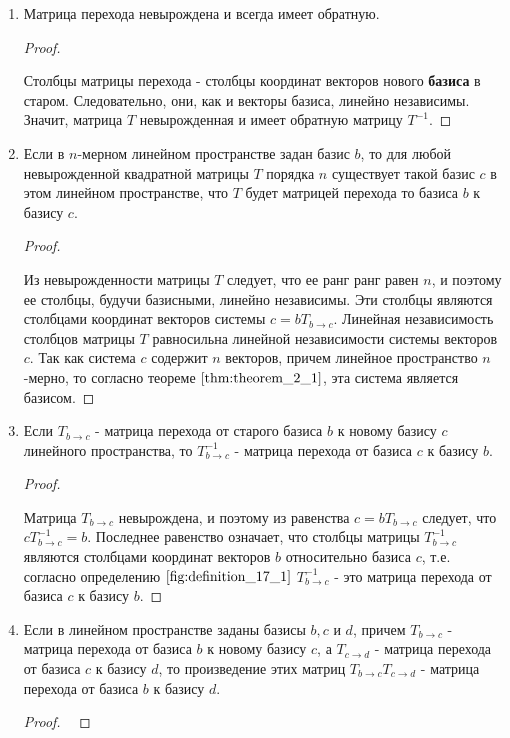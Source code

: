 \begin{enumerate}[label={\arabic*°.}]
    \item Матрица перехода невырождена и всегда имеет обратную.
    \begin{proof}~

        Столбцы матрицы перехода - столбцы координат векторов нового \textbf{базиса} в старом. Следовательно, они, как и векторы базиса, линейно независимы. Значит, матрица $T$ невырожденная и имеет обратную матрицу $T^{-1}$.
    \end{proof}
    
    \item Если в $n$-мерном линейном пространстве задан базис $b$, то для любой невырожденной квадратной матрицы $T$ порядка $n$ существует такой базис $c$ в этом линейном пространстве, что $T$ будет матрицей перехода то базиса $b$ к базису $c$.
    \begin{proof}~

        Из невырожденности матрицы $T$ следует, что ее ранг ранг равен $n$, и поэтому ее столбцы, будучи базисными, линейно независимы. Эти столбцы являются столбцами координат векторов системы $c = bT_{b \to c}$. Линейная независимость столбцов матрицы $T$ равносильна линейной независимости системы векторов $c$. Так как система $c$ содержит $n$ векторов, причем линейное пространство $n$-мерно, то согласно теореме $\eqref{thm:theorem_2_1}$, эта система является базисом.
    \end{proof}
    
    \item Если $T_{b \to c}$ - матрица перехода от старого базиса $b$ к новому базису $c$ линейного пространства, то $T^{-1}_{b \to c}$ - матрица перехода от базиса $c$ к базису $b$.
    \begin{proof}~

        Матрица $T_{b \to c}$ невырождена, и поэтому из равенства $c = bT_{b \to c}$ следует, что $cT^{-1}_{b \to c} = b$. Последнее равенство означает, что столбцы матрицы $T^{-1}_{b \to c}$ являются столбцами координат векторов $b$ относительно базиса $c$, т.е. согласно определению $\eqref{fig:definition_17_1}$ $T^{-1}_{b \to c}$ - это матрица перехода от базиса $c$ к базису $b$.
    \end{proof}

    \item Если в линейном пространстве заданы базисы $b, c$ и $d$, причем $T_{b \to c}$ - матрица перехода от базиса $b$ к новому базису $c$, а $T_{c \to d}$ - матрица перехода от базиса $c$ к базису $d$, то произведение этих матриц $T_{b \to c}T_{c \to d}$ - матрица перехода от базиса $b$ к базису $d$.
    \begin{proof}~


\end{proof}
\end{enumerate}
